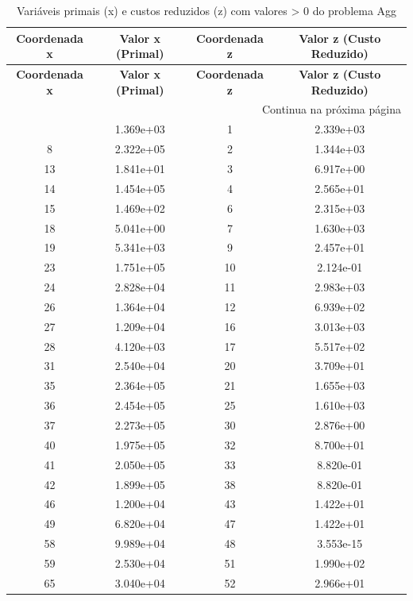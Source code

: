 \documentclass[12pt]{article}
\begin{document}
\begin{longtable}{@{}cccc@{}}
\caption{Variáveis primais (x) e custos reduzidos (z) com valores > 0 do problema Agg} \\
\toprule
\textbf{Coordenada x} & \textbf{Valor x (Primal)} & \textbf{Coordenada z} & \textbf{Valor z (Custo Reduzido)} \\
\midrule
\endfirsthead

\toprule
\textbf{Coordenada x} & \textbf{Valor x (Primal)} & \textbf{Coordenada z} & \textbf{Valor z (Custo Reduzido)} \\
\midrule
\endhead

\midrule \multicolumn{4}{r}{{Continua na próxima página}} \\ \midrule
\endfoot

\bottomrule
\endlastfoot
5 & 1.369e+03 & 1 & 2.339e+03 \\
8 & 2.322e+05 & 2 & 1.344e+03 \\
13 & 1.841e+01 & 3 & 6.917e+00 \\
14 & 1.454e+05 & 4 & 2.565e+01 \\
15 & 1.469e+02 & 6 & 2.315e+03 \\
18 & 5.041e+00 & 7 & 1.630e+03 \\
19 & 5.341e+03 & 9 & 2.457e+01 \\
23 & 1.751e+05 & 10 & 2.124e-01 \\
24 & 2.828e+04 & 11 & 2.983e+03 \\
26 & 1.364e+04 & 12 & 6.939e+02 \\
27 & 1.209e+04 & 16 & 3.013e+03 \\
28 & 4.120e+03 & 17 & 5.517e+02 \\
31 & 2.540e+04 & 20 & 3.709e+01 \\
35 & 2.364e+05 & 21 & 1.655e+03 \\
36 & 2.454e+05 & 25 & 1.610e+03 \\
37 & 2.273e+05 & 30 & 2.876e+00 \\
40 & 1.975e+05 & 32 & 8.700e+01 \\
41 & 2.050e+05 & 33 & 8.820e-01 \\
42 & 1.899e+05 & 38 & 8.820e-01 \\
46 & 1.200e+04 & 43 & 1.422e+01 \\
49 & 6.820e+04 & 47 & 1.422e+01 \\
58 & 9.989e+04 & 48 & 3.553e-15 \\
59 & 2.530e+04 & 51 & 1.990e+02 \\
65 & 3.040e+04 & 52 & 2.966e+01 \\

\end{longtable}
\end{document}
